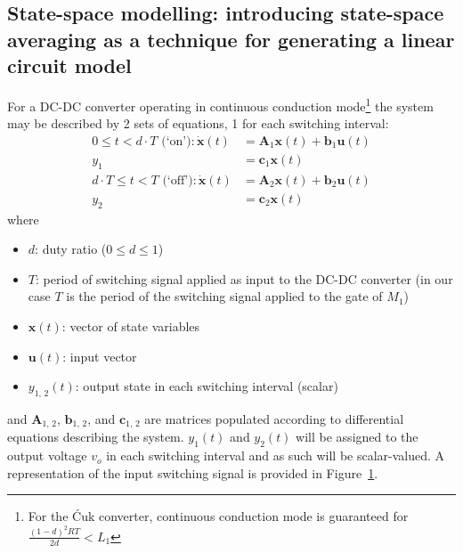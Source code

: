 \subsection{State-space modelling: introducing state-space averaging as a technique for generating a linear circuit model}\label{sec:ss_averaging}
For a DC-DC converter operating in continuous conduction mode\footnote{
For the \'{C}uk converter, continuous conduction mode is guaranteed for $\frac{(1 - d)^2 R T}{2 d} < L_1$
} the system may be described by 2 sets of equations, 1 for each switching interval:
\begin{align}
0 \leq t < d \cdot T \text{ (`on')}:
\dot{\boldsymbol{x}}(t) &= \boldsymbol{A}_1 \boldsymbol{x}(t) + \boldsymbol{b}_1 \boldsymbol{u}(t)
\nonumber
\\[11pt]
y_1&= \boldsymbol{c}_1 \boldsymbol{x}(t)\label{eqn:equations_on}
\\[11pt]
d \cdot T \leq t < T \text{ (`off')}:
\dot{\boldsymbol{x}}(t) &= \boldsymbol{A}_2 \boldsymbol{x}(t) + \boldsymbol{b}_2 \boldsymbol{u}(t)
\nonumber
\\[11pt]
y_2&= \boldsymbol{c}_2 \boldsymbol{x}(t)\label{eqn:equations_off}
\end{align}
where
\begin{itemize}
\item $d$: duty ratio ($0 \leq d \leq 1$)
\item $T$: period of switching signal applied as input to the DC-DC converter (in our case $T$ is the period of the switching signal applied to the gate of $M_1$)
\item $\boldsymbol{x}(t)$: vector of state variables
\item $\boldsymbol{u}(t)$: input vector
\item $y_{1, \, 2}(t)$: output state in each switching interval (scalar)
\end{itemize}
and $\boldsymbol{A}_{1, \, 2}$, $\boldsymbol{b}_{1, \, 2}$, and $\boldsymbol{c}_{1, \, 2}$ are matrices populated according to differential equations describing the system. $y_{1}(t)$ and $y_{2}(t)$ will be assigned to the output voltage $v_o$ in each switching interval and as such will be scalar-valued.
\newpar
A representation of the input switching signal is provided in Figure~\ref{fig:switching}.
\begin{figure}[H]
\centering
{}
\caption{}
\label{fig:switching}
\end{figure}
